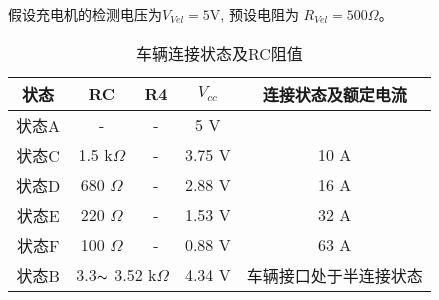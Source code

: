        \begin{example}
         假设充电机的检测电压为$V_{Vel} = 5 \mathrm{V}$, 预设电阻为 $R_{Vel} = 500 \Omega$。
            \begin{table}[H]
                \renewcommand{\arraystretch}{1.3}
                \centering
                \caption{车辆连接状态及RC阻值}
                \begin{tabular}{ccccc}   
                    \toprule
                    状态  & RC  & R4 & $V_{cc}$ & 连接状态及额定电流\\    
                    \midrule
                    状态A  & -  & - & 5 V &   \\
                    状态C  & 1.5 k$\Omega$  & - & 3.75 V &  10 A \\
                    状态D  & 680 $\Omega$  & - &  2.88 V &  16 A  \\
                    状态E  & 220 $\Omega$ & - &   1.53 V &  32 A  \\
                    状态F  & 100 $\Omega$ & - &   0.88 V &  63 A  \\
                    状态B  & \multicolumn{2}{c}{3.3$\thicksim$ 3.52 k$\Omega$} & 4.34 V &车辆接口处于半连接状态\\
                    \bottomrule
                \end{tabular}
                \label{tab:RC2}
            \end{table}


\end{example}
